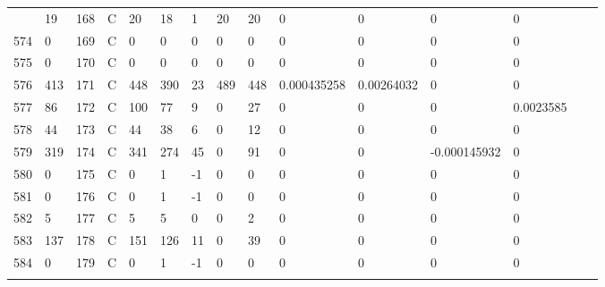 \begin{longtable}{lllllllllllllll}
\begin{comment}
	573 & 19                & 168 & C   & 20                & 18                & 1                 & 20   & 20         & 0              & 0              & 0             & 0            \\
	574 & 0                 & 169 & C   & 0                 & 0                 & 0                 & 0    & 0          & 0              & 0              & 0             & 0            \\
	575 & 0                 & 170 & C   & 0                 & 0                 & 0                 & 0    & 0          & 0              & 0              & 0             & 0            \\
	576 & 413               & 171 & C   & 448               & 390               & 23                & 489  & 448        & 0.000435258    & 0.00264032     & 0             & 0            \\
	577 & 86                & 172 & C   & 100               & 77                & 9                 & 0    & 27         & 0              & 0              & 0             & 0.0023585    \\
	578 & 44                & 173 & C   & 44                & 38                & 6                 & 0    & 12         & 0              & 0              & 0             & 0            \\
	579 & 319               & 174 & C   & 341               & 274               & 45                & 0    & 91         & 0              & 0              & -0.000145932  & 0            \\
	580 & 0                 & 175 & C   & 0                 & 1                 & -1                & 0    & 0          & 0              & 0              & 0             & 0            \\
	581 & 0                 & 176 & C   & 0                 & 1                 & -1                & 0    & 0          & 0              & 0              & 0             & 0            \\
	582 & 5                 & 177 & C   & 5                 & 5                 & 0                 & 0    & 2          & 0              & 0              & 0             & 0            \\
	583 & 137               & 178 & C   & 151               & 126               & 11                & 0    & 39         & 0              & 0              & 0             & 0            \\
	584 & 0                 & 179 & C   & 0                 & 1                 & -1                & 0    & 0          & 0              & 0              & 0             & 0            \\

\end{comment}
\end{longtable}
